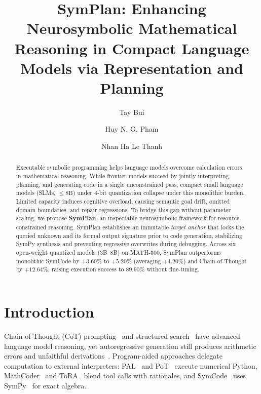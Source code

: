 \documentclass[runningheads]{llncs}
\begin{document}
\title{SymPlan: Enhancing Neurosymbolic Mathematical Reasoning in Compact Language Models via Representation and Planning}

\author{Tay Bui \and
Huy N. G. Pham \and
Nhan Ha Le Thanh}

\maketitle

\begin{abstract}
Executable symbolic programming helps language models overcome calculation errors in mathematical reasoning. While frontier models succeed by jointly interpreting, planning, and generating code in a single unconstrained pass, compact small language models (SLMs, $\le 8\text{B}$) under 4-bit quantization collapse under this monolithic burden. Limited capacity induces cognitive overload, causing semantic goal drift, omitted domain boundaries, and repair regressions. To bridge this gap without parameter scaling, we propose \textbf{SymPlan}, an inspectable neurosymbolic framework for resource-constrained reasoning. SymPlan establishes an immutable \textit{target anchor} that locks the queried unknown and its formal output signature prior to code generation, stabilizing SymPy synthesis and preventing regressive overwrites during debugging. Across six open-weight quantized models (3B--8B) on MATH-500, SymPlan outperforms monolithic SymCode by $+3.60\%$ to $+5.20\%$ (averaging $+4.20\%$) and Chain-of-Thought by $+12.64\%$, raising execution success to $89.90\%$ without fine-tuning.

\end{abstract}

\section{Introduction}

Chain-of-Thought (CoT) prompting~\cite{wei2022cot} and structured search~\cite{wang2023selfconsistency,zhou2023leasttomost,wang2023plan} have advanced language model reasoning, yet autoregressive generation still produces arithmetic errors and unfaithful derivations~\cite{lyu2023faithful,lightman2024verify}. Program-aided approaches delegate computation to external interpreters: PAL~\cite{gao2023pal} and PoT~\cite{chen2022pot} execute numerical Python, MathCoder~\cite{wang2024mathcoder} and ToRA~\cite{gou2024tora} blend tool calls with rationales, and SymCode~\cite{nezhad2025symcode} uses SymPy~\cite{meurer2017sympy} for exact algebra.
\end{document}

